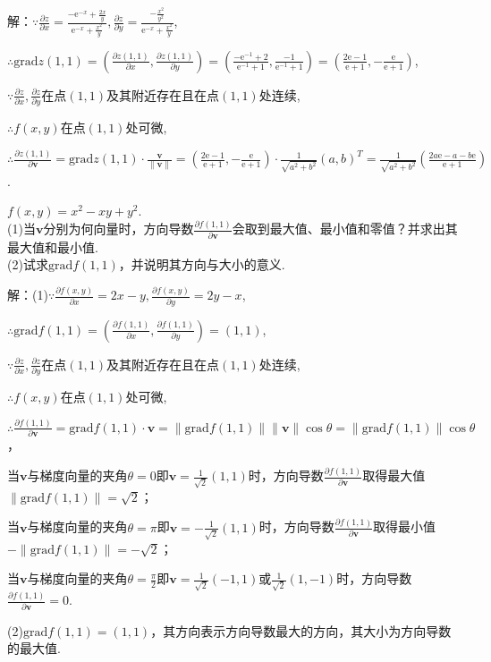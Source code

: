 \documentclass[12pt,UTF8]{ctexart}
\begin{document}
\begin{enumerate}
解：$\because\frac{\partial z}{\partial x}=\frac{-\mathrm e^{-x}+\frac{2x}y}{\mathrm e^{-x}+\frac{x^2}y},\frac{\partial z}{\partial y}=\frac{-\frac{x^2}{y^2}}{\mathrm e^{-x}+\frac{x^2}y}$, 

$\therefore\mathrm{grad}z(1,1)=(\frac{\partial z(1,1)}{\partial x},\frac{\partial z(1,1)}{\partial y})=(\frac{-\mathrm e^{-1}+2}{\mathrm e^{-1}+1},\frac{-1}{\mathrm e^{-1}+1})=(\frac{2\mathrm e-1}{\mathrm e+1},-\frac{\mathrm e}{\mathrm e+1})$,

$\because\frac{\partial z}{\partial x},\frac{\partial z}{\partial y}$在点$(1,1)$及其附近存在且在点$(1,1)$处连续,

$\therefore f(x,y)$在点$(1,1)$处可微,

$\therefore\frac{\partial z(1,1)}{\partial\bm v}=\mathrm{grad}z(1,1)\cdot\frac{\bm v}{\|\bm v\|}=(\frac{2\mathrm e-1}{\mathrm e+1},-\frac{\mathrm e}{\mathrm e+1})\cdot\frac1{\sqrt{a^2+b^2}}(a,b)^T=\frac1{\sqrt{a^2+b^2}}(\frac{2a\mathrm e-a-b\mathrm e}{\mathrm e+1})$.

$f(x,y)=x^2-xy+y^2$.\\
(1)当$\bm v$分别为何向量时，方向导数$\frac{\partial f(1,1)}{\partial\bm v}$会取到最大值、最小值和零值？并求出其最大值和最小值.\\
(2)试求$\mathrm{grad}f(1,1)$，并说明其方向与大小的意义.

解：(1)$\because\frac{\partial f(x,y)}{\partial x}=2x-y,\frac{\partial f(x,y)}{\partial y}=2y-x$,

$\therefore\mathrm{grad}f(1,1)=(\frac{\partial f(1,1)}{\partial x},\frac{\partial f(1,1)}{\partial y})=(1,1)$,

$\because\frac{\partial z}{\partial x},\frac{\partial z}{\partial y}$在点$(1,1)$及其附近存在且在点$(1,1)$处连续,

$\therefore f(x,y)$在点$(1,1)$处可微,

$\therefore\frac{\partial f(1,1)}{\partial\bm v}=\mathrm{grad}f(1,1)\cdot\bm v=\|\mathrm{grad}f(1,1)\|\|\bm v\|\cos\theta=\|\mathrm{grad}f(1,1)\|\cos\theta$，

当$\bm v$与梯度向量的夹角$\theta=0$即$\bm v=\frac1{\sqrt2}(1,1)$时，方向导数$\frac{\partial f(1,1)}{\partial\bm v}$取得最大值$\|\mathrm{grad}f(1,1)\|=\sqrt2$；

当$\bm v$与梯度向量的夹角$\theta=\pi$即$\bm v=-\frac1{\sqrt2}(1,1)$时，方向导数$\frac{\partial f(1,1)}{\partial\bm v}$取得最小值$-\|\mathrm{grad}f(1,1)\|=-\sqrt2$；

当$\bm v$与梯度向量的夹角$\theta=\frac\pi2$即$\bm v=\frac1{\sqrt2}(-1,1)$或$\frac1{\sqrt2}(1,-1)$时，方向导数$\frac{\partial f(1,1)}{\partial\bm v}=0$.

(2)$\mathrm{grad}f(1,1)=(1,1)$，其方向表示方向导数最大的方向，其大小为方向导数的最大值.
\end{enumerate}
\end{document}
